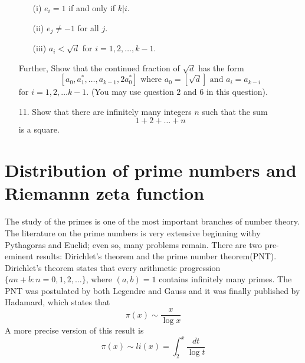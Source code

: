 \begin{enumerate}
    \begin{enumerate}
    \item[(i)] $e_i=1$ if and only if $k|i$.
    \item[(ii)] $e_j \neq -1$ for all $j$.
    \item[(iii)] $a_i < \sqrt{d}$ for $i=1,2,\ldots,k-1$.
    \end{enumerate}
    Further, Show that the continued fraction of $\sqrt{d}$ has the form
    $$[a_0,a_1^*,\ldots,a_{k-1},2a_0^*] \text{ where } a_0=[\sqrt{d}] \text{ and } a_i=a_{k-i}$$
    for $i=1,2,\ldots k-1$. (You may use question $2$ and $6$ in this question).
\item[11.] Show that there are infinitely many integers $n$ such that the sum
    $$1+2+\ldots +n$$ is a square.
\end{enumerate}

\section{Distribution of prime numbers and Riemannn zeta function}
The study of the primes is one of the most important branches of number theory. The literature on the prime numbers is very extensive beginning withy Pythagoras and Euclid; even so, many problems remain.
There are two pre-eminent results: Dirichlet's theorem and the prime number theorem(PNT). Dirichlet's theorem states that every arithmetic progression $\{an+b: n=0,1,2,\ldots\}$, where $(a,b)=1$ contains infinitely many primes. The PNT was postulated by both Legendre and Gauss and it was finally published by Hadamard, which states that
$$\pi(x) \sim \frac{x}{\log{x}}$$
A more precise version of this result is
$$\pi(x) \sim li(x)=\int_2^{x}\frac{dt}{\log{t}}$$
